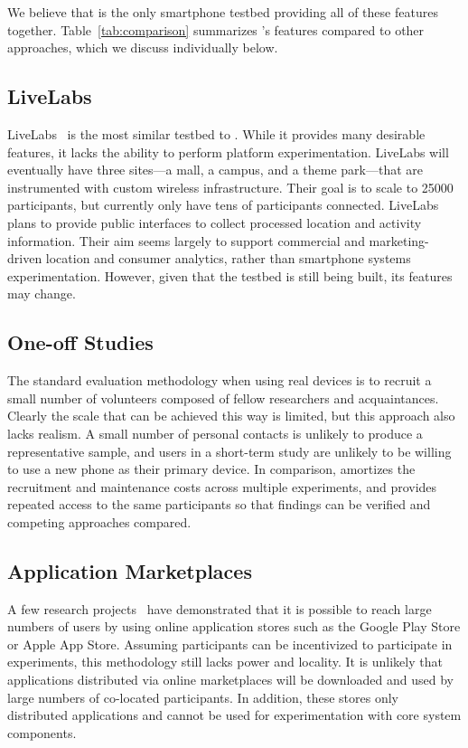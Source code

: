 We believe that \PhoneLab{} is the only smartphone testbed providing all of
these features together. Table~\ref{tab:comparison} summarizes \PhoneLab{}'s
features compared to other approaches, which we discuss individually below.

\subsection{LiveLabs}

LiveLabs~\cite{livelabs} is the most similar testbed to \PhoneLab{}. While it
provides many desirable features, it lacks the ability to perform platform
experimentation. LiveLabs will eventually have three sites---a mall, a
campus, and a theme park---that are instrumented with custom wireless
infrastructure. Their goal is to scale to \num{25000} participants, but
currently only have tens of participants connected. LiveLabs plans to provide
public interfaces to collect processed location and activity information.
Their aim seems largely to support commercial and marketing-driven location
and consumer analytics, rather than smartphone systems experimentation.
However, given that the testbed is still being built, its features may
change.

\subsection{One-off Studies}

The standard evaluation methodology when using real devices is to recruit a
small number of volunteers composed of fellow researchers and acquaintances.
Clearly the scale that can be achieved this way is limited, but this approach
also lacks realism. A small number of personal contacts is unlikely to
produce a representative sample, and users in a short-term study are unlikely
to be willing to use a new phone as their primary device. In comparison,
\PhoneLab{} amortizes the recruitment and maintenance costs across multiple
experiments, and provides repeated access to the same participants so that
findings can be verified and competing approaches compared.

\subsection{Application Marketplaces}

A few research projects~\cite{huang:mobisys:2010, zhang:codes:2010} have
demonstrated that it is possible to reach large numbers of users by using
online application stores such as the Google Play Store or Apple App Store.
Assuming participants can be incentivized to participate in experiments, this
methodology still lacks power and locality. It is unlikely that applications
distributed via online marketplaces will be downloaded and used by large
numbers of co-located participants. In addition, these stores only
distributed applications and cannot be used for experimentation with core
system components.

